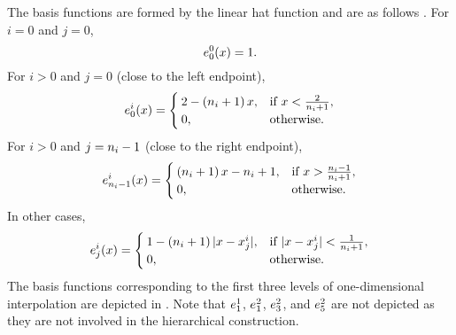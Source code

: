 
The basis functions are formed by the linear hat function and are as follows
\cite{klimke2006}. For $i = 0$ and $j = 0$,
\[
  e^0_0(x) = 1.
\]
For $i > 0$ and $j = 0$ (close to the left endpoint),
\[
  e^i_0(x) = \begin{cases}
    2 - \left( n_i + 1 \right) x, & \text{if } x < \frac{2}{n_i + 1}, \\
    0, & \text{otherwise}.
  \end{cases}
\]
For $i > 0$ and $j = n_i - 1$ (close to the right endpoint),
\[
  e^i_{n_i - 1}(x) = \begin{cases}
    \left( n_i + 1 \right) x - n_i + 1, & \text{if } x > \frac{n_i - 1}{n_i + 1}, \\
    0, & \text{otherwise}.
  \end{cases}
\]
In other cases,
\[
  e^i_j(x) = \begin{cases}
    1 - \left( n_i + 1 \right)|x - x^i_j|, & \text{if } |x - x^i_j| < \frac{1}{n_i + 1}, \\
    0, & \text{otherwise}.
  \end{cases}
\]
The basis functions corresponding to the first three levels of one-dimensional
interpolation are depicted in . Note that $e^1_1$, $e^2_1$,
$e^2_3$, and $e^2_5$ are not depicted as they are not involved in the
hierarchical construction.

